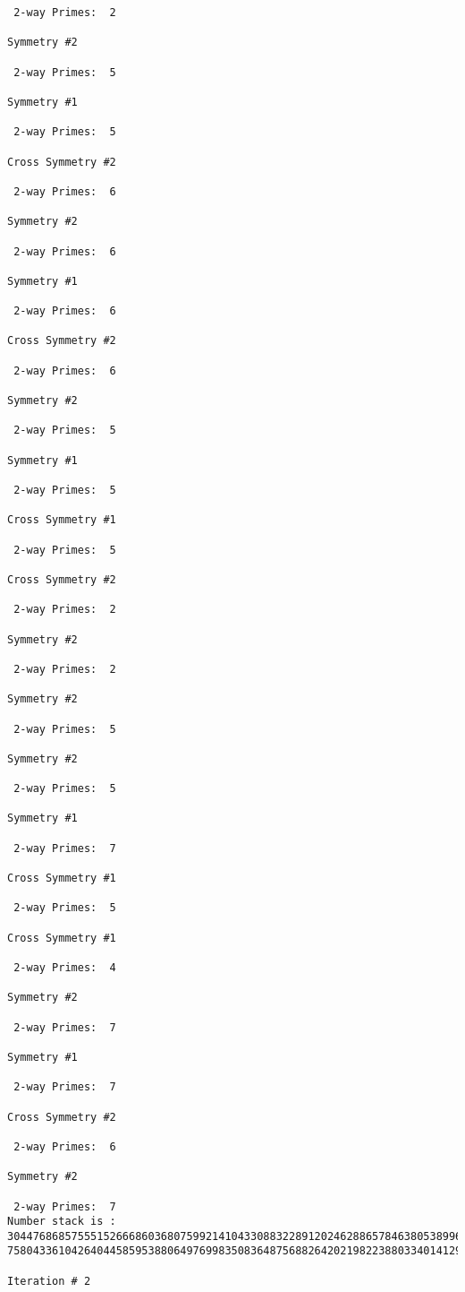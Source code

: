 \begin{verbatim}
 2-way Primes: 	2

Symmetry #2

 2-way Primes: 	5

Symmetry #1

 2-way Primes: 	5

Cross Symmetry #2

 2-way Primes: 	6

Symmetry #2

 2-way Primes: 	6

Symmetry #1

 2-way Primes: 	6

Cross Symmetry #2

 2-way Primes: 	6

Symmetry #2

 2-way Primes: 	5

Symmetry #1

 2-way Primes: 	5

Cross Symmetry #1

 2-way Primes: 	5

Cross Symmetry #2

 2-way Primes: 	2

Symmetry #2

 2-way Primes: 	2

Symmetry #2

 2-way Primes: 	5

Symmetry #2

 2-way Primes: 	5

Symmetry #1

 2-way Primes: 	7

Cross Symmetry #1

 2-way Primes: 	5

Cross Symmetry #1

 2-way Primes: 	4

Symmetry #2

 2-way Primes: 	7

Symmetry #1

 2-way Primes: 	7

Cross Symmetry #2

 2-way Primes: 	6

Symmetry #2

 2-way Primes: 	7
Number stack is :
30447686857555152666860368075992141043308832289120246288657846380538996794608835958544046240163340857
75804336104264044585953880649769983508364875688264202198223880334014129957086306866625155575868674403

Iteration #	2


\end{verbatim}
